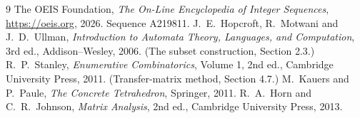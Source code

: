 \documentclass[11pt,a4paper]{article}
\theoremstyle{plain}
\theoremstyle{definition}
\begin{document}
\begin{thebibliography}{9}
 The OEIS Foundation, \emph{The On-Line Encyclopedia of Integer
Sequences}, \url{https://oeis.org}, 2026. Sequence A219811.
 J.~E.~Hopcroft, R.~Motwani and J.~D.~Ullman, \emph{Introduction to Automata
Theory, Languages, and Computation}, 3rd ed., Addison--Wesley, 2006. (The subset
construction, Section 2.3.)
 R.~P.~Stanley, \emph{Enumerative Combinatorics}, Volume 1, 2nd ed.,
Cambridge University Press, 2011. (Transfer-matrix method, Section 4.7.)
 M.~Kauers and P.~Paule, \emph{The Concrete Tetrahedron}, Springer, 2011.
 R.~A.~Horn and C.~R.~Johnson, \emph{Matrix Analysis}, 2nd ed., Cambridge
University Press, 2013.
\end{thebibliography}
\end{document}
